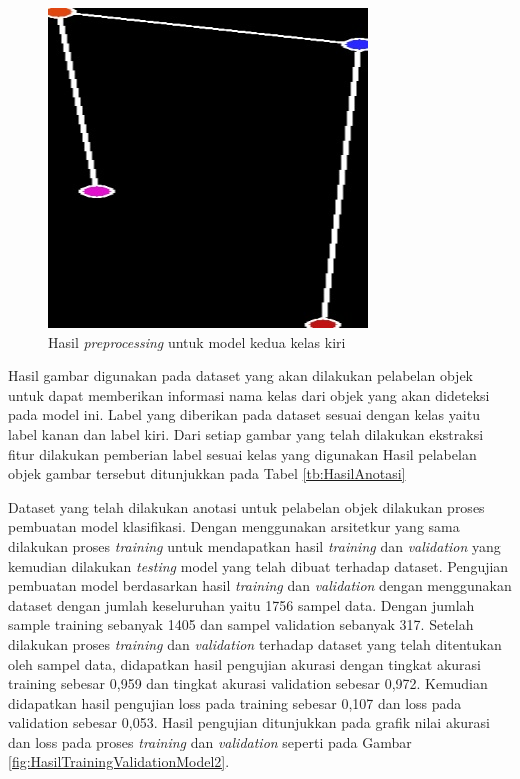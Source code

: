 \begin{figure}[H]
  \centering
  \includegraphics[scale=0.45]{gambar/dataset belakang kiri.jpg}
  \caption{Hasil \emph{preprocessing} untuk model kedua kelas kiri}
  \label{fig:KelasBelakangKiri}
\end{figure}

Hasil gambar digunakan pada dataset yang akan dilakukan pelabelan objek untuk dapat memberikan informasi nama kelas dari objek yang akan dideteksi pada model ini. Label yang diberikan pada dataset sesuai dengan kelas yaitu label kanan dan label kiri. Dari setiap gambar yang telah dilakukan ekstraksi fitur dilakukan pemberian label sesuai kelas yang digunakan Hasil pelabelan objek gambar tersebut ditunjukkan pada Tabel \ref{tb:HasilAnotasi}

Dataset yang telah dilakukan anotasi untuk pelabelan objek dilakukan proses pembuatan model klasifikasi. Dengan menggunakan arsitetkur yang sama dilakukan proses \emph{training} untuk mendapatkan hasil \emph{training} dan \emph{validation} yang kemudian dilakukan \emph{testing} model yang telah dibuat terhadap dataset. Pengujian pembuatan model berdasarkan hasil \emph{training} dan \emph{validation} dengan menggunakan dataset dengan jumlah keseluruhan yaitu 1756 sampel data. Dengan jumlah sample training sebanyak 1405 dan sampel validation sebanyak 317. Setelah dilakukan proses \emph{training} dan \emph{validation} terhadap dataset yang telah ditentukan oleh sampel data, didapatkan hasil pengujian akurasi dengan tingkat akurasi training sebesar 0,959 dan tingkat akurasi validation sebesar 0,972. Kemudian didapatkan hasil pengujian loss pada training sebesar 0,107 dan loss pada validation sebesar 0,053. Hasil pengujian ditunjukkan pada grafik nilai akurasi dan loss pada proses \emph{training} dan \emph{validation} seperti pada Gambar \ref{fig:HasilTrainingValidationModel2}.

